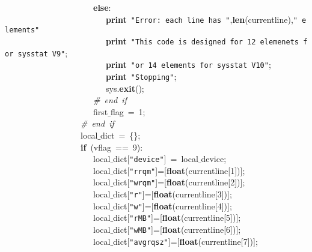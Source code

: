 \mbox{}\ \ \ \ \ \ \ \ \ \ \ \ \ \ \ \ \ \ \ \ \ \textbf{else}: \\
\mbox{}\ \ \ \ \ \ \ \ \ \ \ \ \ \ \ \ \ \ \ \ \ \ \ \ \textbf{print}\ \texttt{"{}Error:\ each\ line\ has\ "{}},\textbf{len}(currentline),\texttt{"{}\ elements"{}} \\
\mbox{}\ \ \ \ \ \ \ \ \ \ \ \ \ \ \ \ \ \ \ \ \ \ \ \ \textbf{print}\ \texttt{"{}This\ code\ is\ designed\ for\ 12\ elemenets\ for\ sysstat\ V9"{}}; \\
\mbox{}\ \ \ \ \ \ \ \ \ \ \ \ \ \ \ \ \ \ \ \ \ \ \ \ \textbf{print}\ \texttt{"{}or\ 14\ elements\ for\ sysstat\ V10"{}}; \\
\mbox{}\ \ \ \ \ \ \ \ \ \ \ \ \ \ \ \ \ \ \ \ \ \ \ \ \textbf{print}\ \texttt{"{}Stopping"{}}; \\
\mbox{}\ \ \ \ \ \ \ \ \ \ \ \ \ \ \ \ \ \ \ \ \ \ \ \ sys.\textbf{exit}(); \\
\mbox{}\ \ \ \ \ \ \ \ \ \ \ \ \ \ \ \ \ \ \ \ \ \textit{\#\ end\ if} \\
\mbox{}\ \ \ \ \ \ \ \ \ \ \ \ \ \ \ \ \ \ \ \ \ first$\_$flag\ =\ 1; \\
\mbox{}\ \ \ \ \ \ \ \ \ \ \ \ \ \ \ \ \ \ \textit{\#\ end\ if} \\
\mbox{}\ \ \ \ \ \ \ \ \ \ \ \ \ \ \ \ \ \ local$\_$dict\ =\ \{\}; \\
\mbox{}\ \ \ \ \ \ \ \ \ \ \ \ \ \ \ \ \ \ \textbf{if}\ (vflag\ ==\ 9): \\
\mbox{}\ \ \ \ \ \ \ \ \ \ \ \ \ \ \ \ \ \ \ \ \ local$\_$dict[\texttt{"{}device"{}}]\ =\ local$\_$device; \\
\mbox{}\ \ \ \ \ \ \ \ \ \ \ \ \ \ \ \ \ \ \ \ \ local$\_$dict[\texttt{"{}rrqm"{}}]=[\textbf{float}(currentline[1])]; \\
\mbox{}\ \ \ \ \ \ \ \ \ \ \ \ \ \ \ \ \ \ \ \ \ local$\_$dict[\texttt{"{}wrqm"{}}]=[\textbf{float}(currentline[2])]; \\
\mbox{}\ \ \ \ \ \ \ \ \ \ \ \ \ \ \ \ \ \ \ \ \ local$\_$dict[\texttt{"{}r"{}}]=[\textbf{float}(currentline[3])];\  \\
\mbox{}\ \ \ \ \ \ \ \ \ \ \ \ \ \ \ \ \ \ \ \ \ local$\_$dict[\texttt{"{}w"{}}]=[\textbf{float}(currentline[4])]; \\
\mbox{}\ \ \ \ \ \ \ \ \ \ \ \ \ \ \ \ \ \ \ \ \ local$\_$dict[\texttt{"{}rMB"{}}]=[\textbf{float}(currentline[5])]; \\
\mbox{}\ \ \ \ \ \ \ \ \ \ \ \ \ \ \ \ \ \ \ \ \ local$\_$dict[\texttt{"{}wMB"{}}]=[\textbf{float}(currentline[6])]; \\
\mbox{}\ \ \ \ \ \ \ \ \ \ \ \ \ \ \ \ \ \ \ \ \ local$\_$dict[\texttt{"{}avgrqsz"{}}]=[\textbf{float}(currentline[7])]; \\
